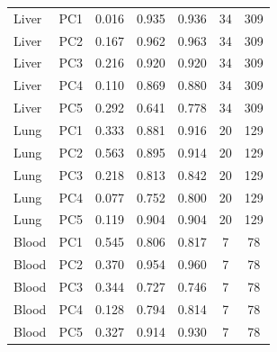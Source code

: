 \documentclass[10pt,a4paper]{article}
\begin{document}
\begin{table}[H]
\begin{tabular}{llccccc}
    \midrule
    Liver & PC1 & 0.016 & 0.935 & 0.936 & 34 & 309 \\
    Liver & PC2 & 0.167 & 0.962 & 0.963 & 34 & 309 \\
    Liver & PC3 & 0.216 & 0.920 & 0.920 & 34 & 309 \\
    Liver & PC4 & 0.110 & 0.869 & 0.880 & 34 & 309 \\
    Liver & PC5 & 0.292 & 0.641 & 0.778 & 34 & 309 \\
    \midrule
    Lung & PC1 & 0.333 & 0.881 & 0.916 & 20 & 129 \\
    Lung & PC2 & 0.563 & 0.895 & 0.914 & 20 & 129 \\
    Lung & PC3 & 0.218 & 0.813 & 0.842 & 20 & 129 \\
    Lung & PC4 & 0.077 & 0.752 & 0.800 & 20 & 129 \\
    Lung & PC5 & 0.119 & 0.904 & 0.904 & 20 & 129 \\
    \midrule
    Blood & PC1 & 0.545 & 0.806 & 0.817 & 7 & 78 \\
    Blood & PC2 & 0.370 & 0.954 & 0.960 & 7 & 78 \\
    Blood & PC3 & 0.344 & 0.727 & 0.746 & 7 & 78 \\
    Blood & PC4 & 0.128 & 0.794 & 0.814 & 7 & 78 \\
    Blood & PC5 & 0.327 & 0.914 & 0.930 & 7 & 78 \\
    \bottomrule
  \end{tabular}
\end{table}

\clearpage

\end{document}
